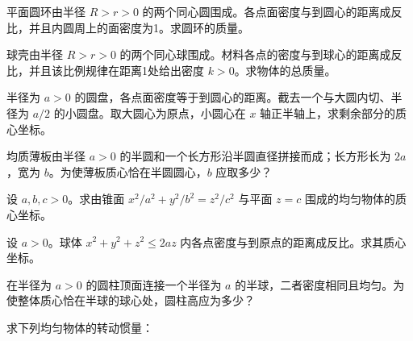 \noindent\begin{minipage}{\textwidth}
平面圆环由半径 $R>r>0$ 的两个同心圆围成。各点面密度与到圆心的距离成反比，并且内圆周上的面密度为1。求圆环的质量。
\end{minipage}\par\vfill
\noindent\begin{minipage}{\textwidth}
球壳由半径 $R>r>0$ 的两个同心球围成。材料各点的密度与到球心的距离成反比，并且该比例规律在距离1处给出密度 $k>0$。求物体的总质量。
\end{minipage}\par\vfill
\newpage
\noindent\begin{minipage}{\textwidth}
半径为 $a>0$ 的圆盘，各点面密度等于到圆心的距离。截去一个与大圆内切、半径为 $a/2$ 的小圆盘。取大圆心为原点，小圆心在 $x$ 轴正半轴上，求剩余部分的质心坐标。
\end{minipage}\par\vfill
\noindent\begin{minipage}{\textwidth}
均质薄板由半径 $a>0$ 的半圆和一个长方形沿半圆直径拼接而成；长方形长为 $2a$，宽为 $b$。为使薄板质心恰在半圆圆心，$b$ 应取多少？
\end{minipage}\par\vfill
\noindent\begin{minipage}{\textwidth}
设 $a,b,c>0$。求由锥面 $x^2/a^2+y^2/b^2=z^2/c^2$ 与平面 $z=c$ 围成的均匀物体的质心坐标。
\end{minipage}\par\vfill
\noindent\begin{minipage}{\textwidth}
设 $a>0$。球体 $x^2+y^2+z^2\le2az$ 内各点密度与到原点的距离成反比。求其质心坐标。
\end{minipage}\par\vfill
\newpage
\noindent\begin{minipage}{\textwidth}
在半径为 $a>0$ 的圆柱顶面连接一个半径为 $a$ 的半球，二者密度相同且均匀。为使整体质心恰在半球的球心处，圆柱高应为多少？
\end{minipage}\par\vfill
\noindent\begin{minipage}{\textwidth}
求下列均匀物体的转动惯量：
\end{minipage}\par\vfill
